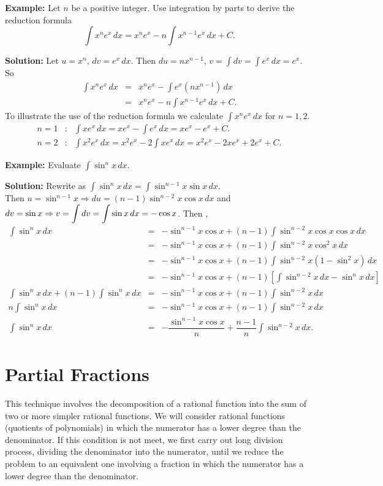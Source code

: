 \documentclass[titlepage,a4paper,12pt]{report}
\begin{document}
\noindent \textbf{Example:} Let $n$ be a positive integer. Use integration  by parts to derive the reduction formula 
\begin{equation*}
\int x^n e^x\, dx =x^ne^x-n\int x^{n-1}e^x\, dx +C.
\end{equation*}

\noindent \textbf{Solution:} Let $u=x^n, \, dv=e^x\, dx$. Then $du=nx^{n-1}$, $v=\displaystyle \int dv=\int e^x \, dx=e^x$. So 
\begin{eqnarray*}
\int x^ne^x\, dx &=&x^ne^x-\int e^x(nx^{n-1})\, dx \\
&=& x^ne^x-n\int x^{n-1}e^x\, dx +C.
\end{eqnarray*} 
To illustrate the use of the reduction formula we calculate $\displaystyle \int x^ne^x\, dx$ for $n=1,2$.
\begin{eqnarray*}
n=1 &:& \int xe^x\, dx =xe^x-\int e^x\, dx=xe^x-e^x+C.\\
n=2 &:& \int x^2e^x\, dx =x^2e^x-2\int xe^x\, dx =x^2e^x-2xe^x+2e^x+C.
\end{eqnarray*}


\noindent \textbf{Example:} Evaluate $\displaystyle \int \sin ^n x \, dx$.

\noindent \textbf{Solution:} Rewrite as $\displaystyle \int \sin ^n x\, dx =\int \sin ^{n-1}x \sin x\, dx$. \\Then $u=\sin ^{n-1}x \Rightarrow du=(n-1)\sin ^{n-2}x \cos x\, dx$ and $dv=\sin x \Rightarrow \\ v=\displaystyle \int dv=\int \sin x \, dx =-\cos x$. Then , 
\begin{eqnarray*}
\int \sin ^n x \, dx &=&-\sin ^{n-1}x \cos x +(n-1)\int \sin ^{n-2}x \cos x \cos x \, dx\\
&=&-\sin ^{n-1}x \cos x +(n-1)\int \sin ^{n-2}x \cos ^2 x\, dx\\
&=&-\sin ^{n-1}x \cos x+(n-1)\int \sin ^{n-2}x (1-\sin ^2 x)\, dx\\
&=&-\sin ^{n-1}x \cos x+(n-1)\left[\int \sin ^{n-2}x \, dx -\sin ^n x \, dx\right]\\
\int \sin ^n x \, dx +(n-1)\int \sin ^n x \, dx &=&-\sin ^{n-1}x \cos x +(n-1)\int \sin ^{n-2}x \, dx\\
n\int \sin ^n x \, dx &=&-\sin ^{n-1}x \cos x +(n-1)\int \sin ^{n-2}x \, dx \\
\int \sin ^n x \, dx &=&- \dfrac{\sin ^{n-1}x\cos x}{n} +\dfrac{n-1}{n}\int \sin ^{n-2}x\, dx.
\end{eqnarray*}
\section{Partial Fractions}
This technique involves the decomposition of a rational function into the sum of two or more simpler rational functions. We will consider rational functions (quotients of polynomials) in which the numerator has a lower degree than the denominator. If this condition is not meet, we first carry out long division process, dividing the denominator into the  numerator, until we reduce the problem to an equivalent one involving a fraction in which the numerator has a lower degree than the denominator. 
\end{document}
